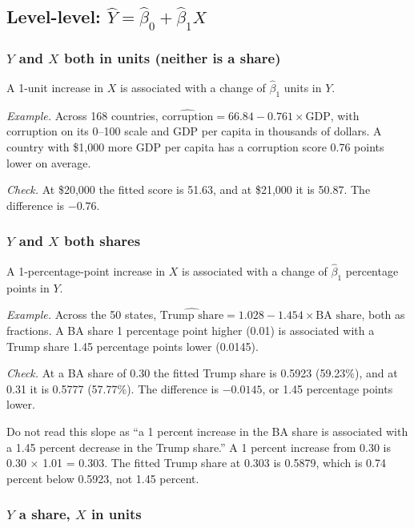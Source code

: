 \documentclass[11pt]{article}
\begin{document}
\subsection{\texorpdfstring{Level-level: $\hat{Y}=\hat{\beta}_0 + \hat{\beta}_1 X$}{Level-level}}

\subsubsection*{$Y$ and $X$ both in units (neither is a share)}

A 1-unit increase in $X$ is associated with a change of $\hat\beta_1$ units in $Y$.

\emph{Example.} Across 168 countries, $\widehat{\text{corruption}} = 66.84 - 0.761\times\text{GDP}$,
with corruption on its 0--100 scale and GDP per capita in thousands of dollars. A country with
\$1,000 more GDP per capita has a corruption score 0.76 points lower on average.

\emph{Check.} At \$20,000 the fitted score is 51.63, and at \$21,000 it is 50.87. The difference is
$-0.76$.

\subsubsection*{$Y$ and $X$ both shares}

A 1-percentage-point increase in $X$ is associated with a change of $\hat\beta_1$ percentage points in
$Y$.

\emph{Example.} Across the 50 states, $\widehat{\text{Trump share}} = 1.028 - 1.454\times\text{BA
share}$, both as fractions. A BA share 1 percentage point higher (0.01) is associated with a Trump
share 1.45 percentage points lower (0.0145).

\emph{Check.} At a BA share of 0.30 the fitted Trump share is 0.5923 (59.23\%), and at 0.31 it is 0.5777
(57.77\%). The difference is $-0.0145$, or 1.45 percentage points lower.

Do not read this slope as ``a 1 percent increase in the BA share is associated with a 1.45 percent
decrease in the Trump share.'' A 1 percent increase from 0.30 is 0.30 $\times$ 1.01 = 0.303. The
fitted Trump share at 0.303 is 0.5879, which is 0.74 percent below 0.5923, not 1.45 percent.

\subsubsection*{$Y$ a share, $X$ in units}
\end{document}
